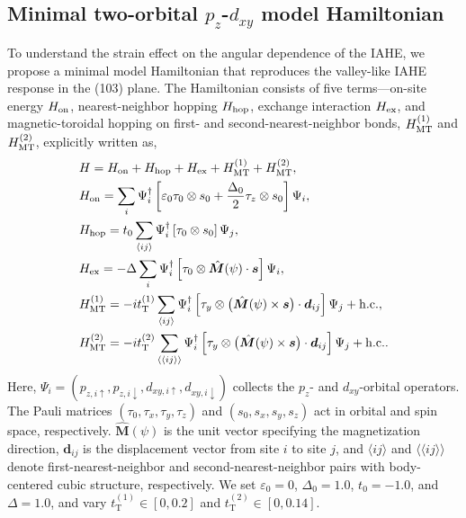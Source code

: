 \documentclass[preprint,12pt]{elsarticle}
\begin{document}
\subsection{Minimal two-orbital $p_z$-$d_{xy}$ model Hamiltonian}
To understand the strain effect on the angular dependence of the IAHE,
we propose a minimal model Hamiltonian that reproduces the
valley-like IAHE response in the (103) plane. The Hamiltonian
consists of five terms---on-site energy $H_{\rm on}$, nearest-neighbor
hopping $H_{\rm hop}$, exchange interaction $H_{\rm ex}$, and
magnetic-toroidal hopping on first- and second-nearest-neighbor
bonds, $H^{(1)}_{\rm MT}$ and $H^{(2)}_{\rm MT}$, explicitly written as,
\begin{align}
  &H=H_{\rm on}+H_{\rm hop}+H_{\rm ex}+H^{(1)}_{\rm MT}+H^{(2)}_{\rm MT}, \\
  &H_{\rm on}
  =\sum_i \Psi_i^\dagger\left[
    \varepsilon_0\tau_0\otimes s_0
    +\frac{\Delta_0}{2}\tau_z\otimes s_0
  \right]\Psi_i,\\
  &H_{\rm hop}
  =t_0\sum_{\langle ij\rangle}\Psi_i^\dagger\left[
    \tau_0\otimes s_0
  \right]\Psi_j,\\
  &H_{\rm ex}
  =-\Delta\sum_i \Psi_i^\dagger\left[
    \tau_0\otimes\hat{\bm M}(\psi)\cdot\bm{s}
  \right]\Psi_i,\\
  &H^{(1)}_{\rm MT}
  =-it^{(1)}_{\mathrm{T}}\sum_{\langle ij\rangle}
  \Psi_i^\dagger\left[
    \tau_y \otimes \big(\hat{\bm{M}}
    (\psi)\times\bm{s}\big)\cdot\bm{d}_{ij}
  \right]\Psi_j+{\rm h.c.}, \\
  &H^{(2)}_{\rm MT}
  =-it^{(2)}_{\mathrm{T}}\sum_{\langle\langle ij\rangle\rangle}
  \Psi_i^\dagger\left[
    \tau_y \otimes \big(\hat{\bm{M}}
    (\psi)\times\bm{s}\big)\cdot\bm{d}_{ij}
  \right]\Psi_j+{\rm h.c.}. \label{eq:minimal Hamiltonian}
\end{align}
Here, $\Psi_i=(p_{z,i\uparrow},p_{z,i\downarrow},d_{xy,i\uparrow},d_{xy,i\downarrow})$
collects the $p_z$- and $d_{xy}$-orbital operators.
The Pauli matrices $(\tau_0,\tau_x,\tau_y,\tau_z)$ and
$(s_0,s_x,s_y,s_z)$ act in orbital and spin space, respectively.
$\hat{\bm M}(\psi)$ is the unit vector specifying the magnetization
direction, $\bm{d}_{ij}$ is the
displacement vector from site $i$ to site $j$, and $\langle
ij\rangle$ and $\langle\!\langle
ij\rangle\!\rangle$ denote first-nearest-neighbor and second-nearest-neighbor
pairs with body-centered cubic structure, respectively. We set
$\varepsilon_0=0$,
$\Delta_0=1.0$, $t_0=-1.0$, and
$\Delta=1.0$, and vary $t^{(1)}_{\mathrm{T}}\in[0,0.2]$ and
$t^{(2)}_{\mathrm{T}}\in[0,0.14]$.
\end{document}

